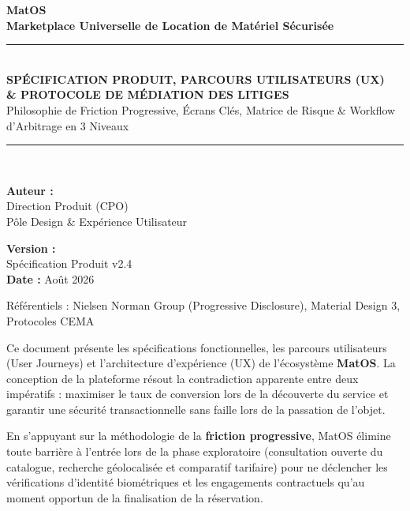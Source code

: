 \documentclass[11pt,a4paper]{report}
\begin{document}
\begin{titlepage}
    \centering
    \vspace*{1.5cm}
    {\Huge\bfseries\color{primaryNavy} MatOS}\\[0.4cm]
    {\LARGE\bfseries\color{accentTeal} Marketplace Universelle de Location de Matériel Sécurisée}\\[1.5cm]
    
    \rule{\linewidth}{1.8pt}\\[0.4cm]
    {\huge\bfseries SPÉCIFICATION PRODUIT, PARCOURS UTILISATEURS (UX)\\\& PROTOCOLE DE MÉDIATION DES LITIGES}\\[0.3cm]
    {\large Philosophie de Friction Progressive, Écrans Clés, Matrice de Risque \& Workflow d'Arbitrage en 3 Niveaux}\\[0.4cm]
    \rule{\linewidth}{1.8pt}\\[2.2cm]
    
    \begin{minipage}{0.45\textwidth}
        \begin{flushleft} \large
            \textbf{Auteur :}\\
            Direction Produit (CPO)\\
            Pôle Design \& Expérience Utilisateur
        \end{flushleft}
    \end{minipage}
    \hfill
    \begin{minipage}{0.45\textwidth}
        \begin{flushright} \large
            \textbf{Version :}\\
            Spécification Produit v2.4\\
            \textbf{Date :} Août 2026
        \end{flushright}
    \end{minipage}
    
    \vfill
    {\small Référentiels : Nielsen Norman Group (Progressive Disclosure), Material Design 3, Protocoles CEMA}
\end{titlepage}

\tableofcontents
\newpage

\begin{tcolorbox}[execbox]
Ce document présente les spécifications fonctionnelles, les parcours utilisateurs (User Journeys) et l'architecture d'expérience (UX) de l'écosystème \textbf{MatOS}. La conception de la plateforme résout la contradiction apparente entre deux impératifs : maximiser le taux de conversion lors de la découverte du service et garantir une sécurité transactionnelle sans faille lors de la passation de l'objet.

En s'appuyant sur la méthodologie de la \textbf{friction progressive}, MatOS élimine toute barrière à l'entrée lors de la phase exploratoire (consultation ouverte du catalogue, recherche géolocalisée et comparatif tarifaire) pour ne déclencher les vérifications d'identité biométriques et les engagements contractuels qu'au moment opportun de la finalisation de la réservation.
\end{tcolorbox}
\end{document}
